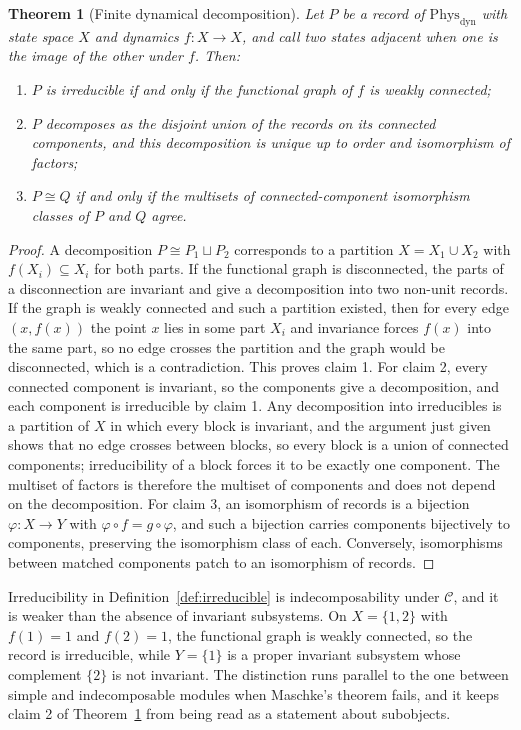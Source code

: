 \documentclass[11pt,letterpaper]{article}
\newtheorem{theorem}{Theorem}[section]
\theoremstyle{definition}
\theoremstyle{remark}
\begin{document}
\begin{theorem}[Finite dynamical decomposition]
\label{thm:dynamical-decomposition}
Let $P$ be a record of $\mathrm{Phys}_{\mathrm{dyn}}$ with state space $X$ and dynamics $f \colon X \to X$, and call two states adjacent when one is the image of the other under $f$. Then:
\begin{enumerate}
\item $P$ is irreducible if and only if the functional graph of $f$ is weakly connected;
\item $P$ decomposes as the disjoint union of the records on its connected components, and this decomposition is unique up to order and isomorphism of factors;
\item $P \cong Q$ if and only if the multisets of connected-component isomorphism classes of $P$ and $Q$ agree.
\end{enumerate}
\end{theorem}

\begin{proof}
A decomposition $P \cong P_1 \sqcup P_2$ corresponds to a partition $X = X_1 \cup X_2$ with $f(X_i) \subseteq X_i$ for both parts. If the functional graph is disconnected, the parts of a disconnection are invariant and give a decomposition into two non-unit records. If the graph is weakly connected and such a partition existed, then for every edge $(x, f(x))$ the point $x$ lies in some part $X_i$ and invariance forces $f(x)$ into the same part, so no edge crosses the partition and the graph would be disconnected, which is a contradiction. This proves claim 1. For claim 2, every connected component is invariant, so the components give a decomposition, and each component is irreducible by claim 1. Any decomposition into irreducibles is a partition of $X$ in which every block is invariant, and the argument just given shows that no edge crosses between blocks, so every block is a union of connected components; irreducibility of a block forces it to be exactly one component. The multiset of factors is therefore the multiset of components and does not depend on the decomposition. For claim 3, an isomorphism of records is a bijection $\varphi \colon X \to Y$ with $\varphi \circ f = g \circ \varphi$, and such a bijection carries components bijectively to components, preserving the isomorphism class of each. Conversely, isomorphisms between matched components patch to an isomorphism of records.
\end{proof}

Irreducibility in Definition~\ref{def:irreducible} is indecomposability under $\mathcal{C}$, and it is weaker than the absence of invariant subsystems. On $X = \{1, 2\}$ with $f(1) = 1$ and $f(2) = 1$, the functional graph is weakly connected, so the record is irreducible, while $Y = \{1\}$ is a proper invariant subsystem whose complement $\{2\}$ is not invariant. The distinction runs parallel to the one between simple and indecomposable modules when Maschke's theorem fails, and it keeps claim 2 of Theorem~\ref{thm:dynamical-decomposition} from being read as a statement about subobjects.
\end{document}
